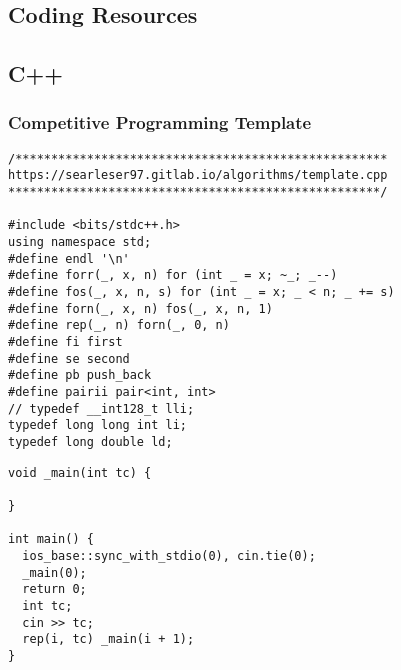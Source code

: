 \documentclass[twoside]{article}
\begin{document}

\null
\thispagestyle{empty}
\newpage
{}
\selectfont
\begin{multicols*}{2}
	\tableofcontents
	\newpage
	\cleardoublepage
{}
\sectionfont{\bfseries\sffamily\centering\Huge}
\vspace{1em}
\section*{Coding Resources}
\vspace{3em}
\subsectionfont{\bfseries\sffamily\centering\LARGE}
\vspace{0em}
\subsection*{C++}
\vspace{2em}
\subsubsectionfont{\large\bfseries\sffamily\underline}
\subsubsection*{Competitive Programming Template}
\begin{verbatim}
/****************************************************
https://searleser97.gitlab.io/algorithms/template.cpp
****************************************************/

#include <bits/stdc++.h>
using namespace std;
#define endl '\n'
#define forr(_, x, n) for (int _ = x; ~_; _--)
#define fos(_, x, n, s) for (int _ = x; _ < n; _ += s)
#define forn(_, x, n) fos(_, x, n, 1)
#define rep(_, n) forn(_, 0, n)
#define fi first
#define se second
#define pb push_back
#define pairii pair<int, int>
// typedef __int128_t lli;
typedef long long int li;
typedef long double ld;
\end{verbatim}
\vspace{-12pt}
\begin{verbatim}
void _main(int tc) {
  
}

int main() {
  ios_base::sync_with_stdio(0), cin.tie(0);
  _main(0);
  return 0;
  int tc;
  cin >> tc;
  rep(i, tc) _main(i + 1);
}
\end{verbatim}

\subsubsectionfont{\large\bfseries\sffamily\underline}

\end{multicols*}
\end{document}
